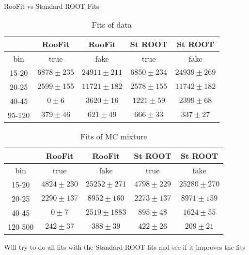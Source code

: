 \documentclass{beamer}
\begin{document}
\begin{frame}{RooFit vs Standard ROOT Fits}
{

\begin{table}[h]
  \tiny
  \begin{center}
  \caption{Fits of data}
  \begin{tabular}{|c|c|c|c|c|}
     & RooFit & RooFit & St ROOT & St ROOT \\ \hline
 bin  & true & fake & true & fake \\ \hline
15-20 &  $6878\pm235$  &  $24911\pm211$  &  $6850\pm234$  &  $24939\pm269$ \\ \hline 
20-25 &  $2599\pm155$  &  $11721\pm182$  &  $2578\pm155$  &  $11742\pm182$ \\ \hline 
40-45 &  $0\pm6$  &  $3620\pm16$  &  $1221\pm59$  &  $2399\pm68$ \\ \hline 
95-120 &  $379\pm46$  &  $621\pm49$  &  $666\pm33$  &  $337\pm27$ \\ \hline 
  \end{tabular}
  \end{center}
\end{table}

\begin{table}[h]
  \tiny
  \begin{center}
  \caption{Fits of MC mixture}
  \begin{tabular}{|c|c|c|c|c|}
     & RooFit & RooFit & St ROOT & St ROOT \\ \hline
 bin  & true & fake & true & fake \\ \hline
15-20 &  $4824\pm230$  &  $25252\pm271$  &  $4798\pm229$  &  $25280\pm270$ \\ \hline 
20-25 &  $2290\pm137$  &  $8952\pm160$  &  $2273\pm137$  &  $8971\pm159$ \\ \hline 
40-45 &  $0\pm7$  &  $2519\pm1883$  &  $895\pm48$  &  $1624\pm55$ \\ \hline 
120-500 &  $242\pm37$  &  $388\pm39$  &  $422\pm26$  &  $209\pm21$ \\ \hline 
  \end{tabular}
  \end{center}
\end{table}

Will try to do all fits with the Standard ROOT fits and see if it improves the fits

}
\end{frame}
\end{document}
